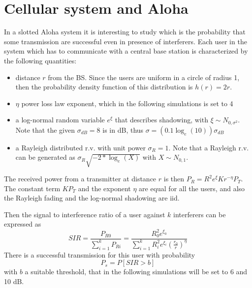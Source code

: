 \documentclass[10pt]{article}
\begin{document}
\section*{Cellular system and Aloha}
In a slotted Aloha system it is interesting to study which is the probability that some transmission are successful even in presence of interferers. 
Each user in the system which has to communicate with a central base station is characterized by the following quantities:
\begin{itemize}
\item distance $r$ from the BS. Since the users are uniform in a circle of radius 1, then the probability density function of this distribution is $h(r) = 2r$.
\item $\eta$ power loss law exponent, which in the following simulations is set to 4
\item a log-normal random variable $e^{\xi}$ that describes shadowing, with $\xi \sim N_{0,\sigma^2}$. Note that the given $\sigma_{dB}= 8$ is in dB, thus $\sigma = (0.1 \log_e(10))\sigma_{dB}$
\item a Rayleigh distributed r.v. with unit power $\sigma_R = 1$. Note that a Rayleigh r.v. can be generated as $\sigma_R \sqrt{-2*\log_e(X)}$ with $X \sim N_{0,1}$.
\end{itemize}
The received power from a transmitter at distance $r$ is then $P_R = R^2 e^{\xi} K r^{-\eta} P_T$. The constant term $K P_T$ and the exponent $\eta$ are equal for all the users, and also the Rayleigh fading and the log-normal shadowing are iid. 

Then the signal to interference ratio of a user against $k$ interferers can be expressed as
\begin{equation}
  SIR = \frac{P_{R0}}{\sum_{i=1}^{k} P_{Ri}} = \frac{R_0^2 e^{\xi_0}}{\sum_{i = 1}^{k}R_i^2 e^{\xi_i}\left(\frac{r_0}{r}\right)^{\eta}}
\end{equation}
There is a successful transmission for this user with probability 
\begin{equation}
  P_s = P[SIR > b]
  \label{eq:ps}
\end{equation}
with $b$ a suitable threshold, that in the following simulations will be set to 6 and 10 dB. 
\end{document}
